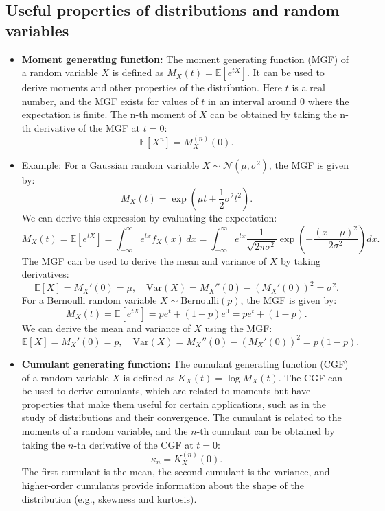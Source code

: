 \documentclass[12pt]{article}
\begin{document}
\begin{singlespace}
\section{Useful properties of distributions and random variables}
\begin{itemize}
    \item \textbf{Moment generating function:} The moment generating function (MGF) of a random variable $X$ is defined as $M_X(t) = \mathbb{E}[e^{tX}]$. It can be used to derive moments and other properties of the distribution. Here $t$ is a real number, and the MGF exists for values of $t$ in an interval around 0 where the expectation is finite. The n-th moment of $X$ can be obtained by taking the n-th derivative of the MGF at $t=0$:
    \[
    \mathbb{E}[X^n] = M_X^{(n)}(0).
    \]
    \item Example: For a Gaussian random variable $X \sim \mathcal{N}(\mu, \sigma^2)$, the MGF is given by:
    \[
    M_X(t) = \exp\left(\mu t + \frac{1}{2} \sigma^2 t^2\right).
    \]
    We can derive this expression by evaluating the expectation:
    \[
    M_X(t) = \mathbb{E}[e^{tX}] = \int_{-\infty}^{\infty} e^{tx} f_X(x) \,dx = \int_{-\infty}^{\infty} e^{tx} \frac{1}{\sqrt{2\pi\sigma^2}} \exp\left(-\frac{(x - \mu)^2}{2\sigma^2}\right) dx.
    \]
    The MGF can be used to derive the mean and variance of $X$ by taking derivatives:
    \[
    \mathbb{E}[X] = M_X'(0) = \mu, \quad \text{Var}(X) = M_X''(0) - (M_X'(0))^2 = \sigma^2.
    \]
    For a Bernoulli random variable $X \sim \text{Bernoulli}(p)$, the MGF is given by:
    \[  M_X(t) = \mathbb{E}[e^{tX}] = p e^t + (1-p) e^0 = p e^t + (1-p). \]
    We can derive the mean and variance of $X$ using the MGF:
    \[
    \mathbb{E}[X] = M_X'(0) = p, \quad \text{Var}(X) = M_X''(0) - (M_X'(0))^2 = p(1-p).
    \]
    \item \textbf{Cumulant generating function:} The cumulant generating function (CGF) of a random variable $X$ is defined as $K_X(t) = \log M_X(t)$. The CGF can be used to derive cumulants, which are related to moments but have properties that make them useful for certain applications, such as in the study of distributions and their convergence. The cumulant is related to the moments of a random variable, and the $n$-th cumulant can be obtained by taking the $n$-th derivative of the CGF at $t=0$:
    \[
    \kappa_n = K_X^{(n)}(0).
    \] The first cumulant is the mean, the second cumulant is the variance, and higher-order cumulants provide information about the shape of the distribution (e.g., skewness and kurtosis).\\

\end{itemize}
\end{singlespace}
\end{document}
